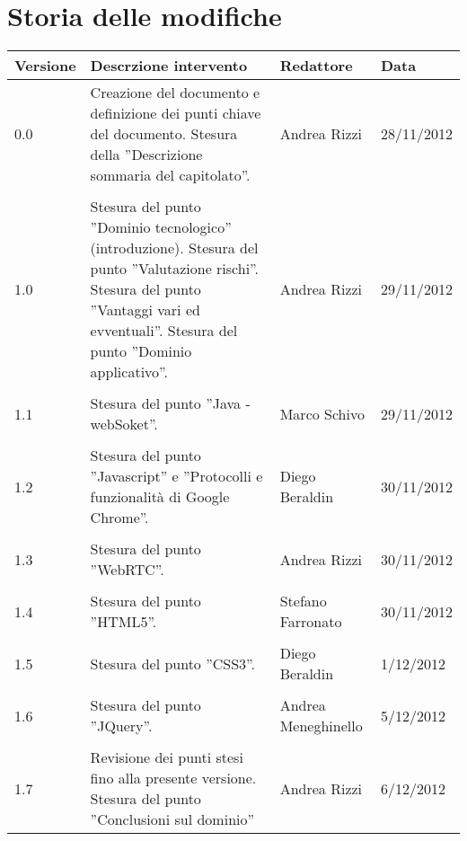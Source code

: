 \section*{Storia delle modifiche}
\begin{tabularx}{\textwidth}{lXll}
\toprule
Versione & Descrzione intervento & Redattore & Data\\
\midrule %
0.0 & Creazione del documento e definizione dei punti chiave del documento. Stesura della ''Descrizione sommaria del capitolato''. & Andrea Rizzi & 28/11/2012\\\\
1.0 & Stesura del punto ''Dominio tecnologico'' (introduzione). Stesura del punto ''Valutazione rischi''. Stesura del punto ''Vantaggi vari ed evventuali''. Stesura del punto ''Dominio applicativo''.  & Andrea Rizzi & 29/11/2012\\\\
1.1 & Stesura del punto ''Java - webSoket''.  & Marco Schivo & 29/11/2012\\\\
1.2 & Stesura del punto ''Javascript'' e ''Protocolli e funzionalità di Google Chrome''.  & Diego Beraldin & 30/11/2012\\\\1.3 & Stesura del punto ''WebRTC''. & Andrea Rizzi & 30/11/2012\\\\1.4 & Stesura del punto ''HTML5''. & Stefano Farronato & 30/11/2012\\\\1.5 & Stesura del punto ''CSS3''. & Diego Beraldin & 1/12/2012\\\\1.6 & Stesura del punto ''JQuery''. & Andrea Meneghinello & 5/12/2012\\\\1.7 & Revisione dei punti stesi fino alla presente versione. Stesura del punto ''Conclusioni sul dominio'' & Andrea Rizzi & 6/12/2012\\
\bottomrule
\end{tabularx}
\newpage



\setcounter{page}{1}
\pagestyle{normal}





